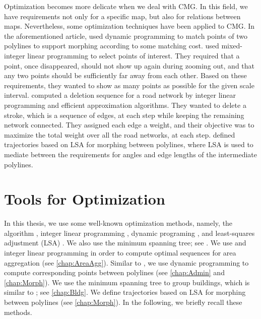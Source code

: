 Optimization becomes more delicate
when we deal with CMG.
In this field, we have requirements 
not only for a specific map, 
but also for relations between maps. 
%
Nevertheless, some optimization techniques 
have been applied to CMG.
In the aforementioned article,
\textcite{Noellenburg2008} used dynamic programming
to match points of two polylines to support morphing
according to some matching cost.
\textcite{sahw-oarps-ICAGW13} used 
mixed-integer linear programming 
to select points of interest.
They required that 
a point, once disappeared, should not show up again 
during zooming out, 
and that any two points should be 
sufficiently far away from each other.
Based on these requirements, 
they wanted to show as many points as possible 
for the given scale interval.
\textcite{Chimani2014Eat} computed a deletion sequence
for a road network by integer linear programming
and efficient approximation algorithms.
They wanted to delete a stroke, 
which is a sequence of edges, at each step
while keeping the remaining network connected.
They assigned each edge a weight, 
and their objective was to maximize the total weight 
over all the road networks, at each step.
\textcite{Peng2013LSA} defined trajectories 
based on LSA for morphing between polylines, 
where LSA is used to mediate between the requirements 
for angles and edge lengths of the intermediate polylines.

\section{Tools for Optimization}
\label{sec:Intro_Tools}

In this thesis, we use some well-known optimization methods,
namely,
the \Astar algorithm \parencite{Hart1968}, 
integer linear programming
\parencite[chapter~13]{Papadimitriou1982combinatorial},
dynamic programing \parencite[chapter~15]{Cormen2009}, and
least-squares adjustment (LSA) \parencite[chapter~3]{Koch1988}.
We also use the minimum spanning tree;
see \parencite[chapter~23]{Cormen2009}.
%
We use \Astar and integer linear programming in order 
to compute optimal sequences for 
area aggregation (see \chap\ref{chap:AreaAgg}).
Similar to \textcite{Noellenburg2008},
we use dynamic programming to 
compute corresponding points between polylines
(see \chaps\ref{chap:Admin} and \ref{chap:Morph}).
We use the minimum spanning tree to group buildings,
which is similar to \textcite{Regnauld2001}; see \chap\ref{chap:Bldg}.
We define trajectories based on LSA 
for morphing between polylines (see \chap\ref{chap:Morph}).
In the following, we briefly recall these methods.


